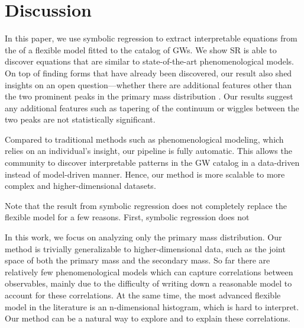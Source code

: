 \documentclass[nohyperref]{article}
\theoremstyle{plain}
\theoremstyle{definition}
\theoremstyle{remark}
\begin{document}
\section{Discussion}
\label{sec:discussion}

In this paper, we use symbolic regression to extract interpretable equations from the \ppd of a flexible model fitted to the catalog of GWs.
We show SR is able to discover equations that are similar to state-of-the-art phenomenological models.
On top of finding forms that have already been discovered,
our result also shed insights on an open question---whether there are additional features other than the two prominent peaks in the primary mass distribution \cite{Tiwari:2021yvr}.
Our results suggest any additional features such as tapering of the continuum or wiggles between the two peaks are not statistically significant.

Compared to traditional methods such as phenomenological modeling, which relies on an individual's insight,
our pipeline is fully automatic.
This allows the community to discover interpretable patterns in the GW catalog in a data-driven instead of model-driven manner.
Hence, our method is more scalable to more complex and higher-dimensional datasets.

Note that the result from symbolic regression does not completely replace the flexible model for a few reasons.
First, symbolic regression does not 

In this work, we focus on analyzing only the primary mass distribution.
Our method is trivially generalizable to higher-dimensional data, such as the joint space of both the primary mass and the secondary mass.
So far there are relatively few phenomenological models which can capture correlations between observables,
mainly due to the difficulty of writing down a reasonable model to account for these correlations.
At the same time, the most advanced flexible model in the literature is an n-dimensional histogram, which is hard to interpret.
Our method can be a natural way to explore and to explain these correlations.



\end{document}
